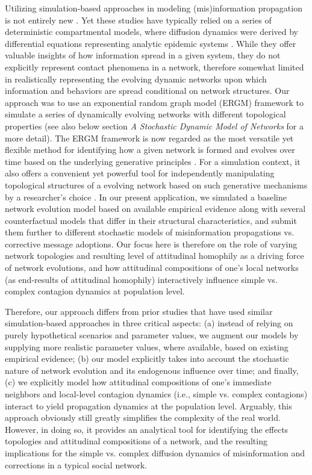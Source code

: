 \documentclass[man, 12pt, a4paper, nolmodern, noextraspace]{apa6}
\begin{document}
    Utilizing simulation-based approaches in modeling (mis)information propagation is not entirely new \parencite[e.g.,][]{tambuscio2015fact, jin2013epidemiological, zhao2010weak}. Yet these studies have typically relied on a series of deterministic compartmental models, where diffusion dynamics were derived by differential equations representing analytic epidemic systems \parencite[e.g., see][]{zhao2010weak}. While they offer valuable insights of how information spread in a given system, they do not explicitly represent contact phenomena in a network, therefore somewhat limited in realistically representing the evolving dynamic networks upon which information and behaviors are spread conditional on network structures. Our approach was to use an exponential random graph model (ERGM) framework \parencite{robins2007introduction, morris2008specification} to simulate a series of dynamically evolving networks with different topological properties (see also below section \textit{A Stochastic Dynamic Model of Networks} for a more detail). The ERGM framework is now regarded as the most versatile yet flexible method for identifying how a given network is formed and evolves over time based on the underlying generative principles \parencite{cranmer2017navigating, robins2007introduction}. For a simulation context, it also offers a convenient yet powerful tool for independently manipulating topological structures of a evolving network based on such generative mechanisms by a researcher's choice \parencite{morris2008specification, leifeld2017temporal}. In our present application, we simulated a baseline network evolution model based on available empirical evidence along with several counterfactual models that differ in their structural characteristics, and submit them further to different stochastic models of misinformation propagations vs. corrective message adoptions. Our focus here is therefore on the role of varying network topologies and resulting level of attitudinal homophily as a driving force of network evolutions, and how attitudinal compositions of one's local networks (as end-results of attitudinal homophily) interactively influence simple vs. complex contagion dynamics at population level.
    
    Therefore, our approach differs from prior studies that have used similar simulation-based approaches in three critical aspects: (a) instead of relying on purely hypothetical scenarios and parameter values, we augment our models by supplying more realistic parameter values, where available, based on existing empirical evidence; (b) our model explicitly takes into account the stochastic nature of network evolution and its endogenous influence over time; and finally, (c) we explicitly model how attitudinal compositions of one's immediate neighbors and local-level contagion dynamics (i.e., simple vs. complex contagions) interact to yield propagation dynamics at the population level. Arguably, this approach obviously still greatly simplifies the complexity of the real world. However, in doing so, it provides an analytical tool for identifying the effects topologies and attitudinal compositions of a network, and the resulting implications for the simple vs. complex diffusion dynamics of misinformation and corrections in a typical social network.
\end{document}
